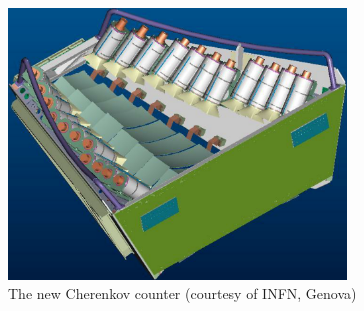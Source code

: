 \begin{figure}[h] %
\centering
\leavevmode \includegraphics[width=0.8\textwidth]{figuresEG4/FigExp/assieme_totaleCut.pdf}  %
\caption[New Cherenkov counter]{The new Cherenkov counter (courtesy of INFN, Genova)}
\label{nwCcCAD}
\end{figure}



